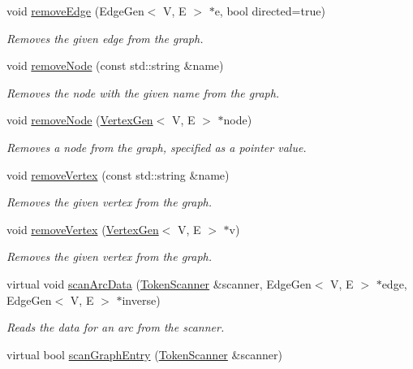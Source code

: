 \begin{DoxyCompactItemize}
void \mbox{\hyperlink{classBasicGraphGen_a2c6bb1e8e2c18b7376504692f7baae62}{remove\+Edge}} (Edge\+Gen$<$ V, E $>$ $\ast$e, bool directed=true)
\begin{DoxyCompactList}\small\item\em Removes the given edge from the graph. \end{DoxyCompactList}\item 
void \mbox{\hyperlink{classGraph_a2d5f7ee89176144ed4c5c6b08a233aa6}{remove\+Node}} (const std\+::string \&name)
\begin{DoxyCompactList}\small\item\em Removes the node with the given name from the graph. \end{DoxyCompactList}\item 
void \mbox{\hyperlink{classGraph_a2dfe63019975561914e0ed79551de108}{remove\+Node}} (\mbox{\hyperlink{classVertexGen}{Vertex\+Gen}}$<$ V, E $>$ $\ast$node)
\begin{DoxyCompactList}\small\item\em Removes a node from the graph, specified as a pointer value. \end{DoxyCompactList}\item 
void \mbox{\hyperlink{classBasicGraphGen_aaa33b4c05ee490d241ba5542420b985b}{remove\+Vertex}} (const std\+::string \&name)
\begin{DoxyCompactList}\small\item\em Removes the given vertex from the graph. \end{DoxyCompactList}\item 
void \mbox{\hyperlink{classBasicGraphGen_a9eac2d17b5e8074dace019020d078acb}{remove\+Vertex}} (\mbox{\hyperlink{classVertexGen}{Vertex\+Gen}}$<$ V, E $>$ $\ast$v)
\begin{DoxyCompactList}\small\item\em Removes the given vertex from the graph. \end{DoxyCompactList}\item 
virtual void \mbox{\hyperlink{classBasicGraphGen_a4314b3b6bda0755a87e49070edd17c3d}{scan\+Arc\+Data}} (\mbox{\hyperlink{classTokenScanner}{Token\+Scanner}} \&scanner, Edge\+Gen$<$ V, E $>$ $\ast$edge, Edge\+Gen$<$ V, E $>$ $\ast$inverse)
\begin{DoxyCompactList}\small\item\em Reads the data for an arc from the scanner. \end{DoxyCompactList}\item 
virtual bool \mbox{\hyperlink{classGraph_a1c4e1a05a40013ce4e4bb539d05b9937}{scan\+Graph\+Entry}} (\mbox{\hyperlink{classTokenScanner}{Token\+Scanner}} \&scanner)

\end{DoxyCompactItemize}
